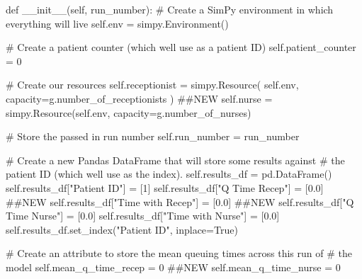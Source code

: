 \documentclass[
  letterpaper,
  DIV=11,
  numbers=noendperiod]{scrreprt}
\newenvironment{Shaded}{}{}
\newcommand{\CommentTok}[1]{\textcolor[rgb]{0.42,0.45,0.49}{#1}}
\newcommand{\DecValTok}[1]{\textcolor[rgb]{0.00,0.36,0.77}{#1}}
\newcommand{\FloatTok}[1]{\textcolor[rgb]{0.00,0.36,0.77}{#1}}
\newcommand{\FunctionTok}[1]{\textcolor[rgb]{0.44,0.26,0.76}{#1}}
\newcommand{\KeywordTok}[1]{\textcolor[rgb]{0.84,0.23,0.29}{#1}}
\newcommand{\NormalTok}[1]{\textcolor[rgb]{0.14,0.16,0.18}{#1}}
\newcommand{\OperatorTok}[1]{\textcolor[rgb]{0.14,0.16,0.18}{#1}}
\newcommand{\StringTok}[1]{\textcolor[rgb]{0.01,0.18,0.38}{#1}}
\newcommand{\VariableTok}[1]{\textcolor[rgb]{0.89,0.38,0.04}{#1}}
\begin{document}
\begin{Shaded}
\begin{Highlighting}[]
\KeywordTok{def} \FunctionTok{\_\_init\_\_}\NormalTok{(}\VariableTok{self}\NormalTok{, run\_number):}
        \CommentTok{\# Create a SimPy environment in which everything will live}
        \VariableTok{self}\NormalTok{.env }\OperatorTok{=}\NormalTok{ simpy.Environment()}

        \CommentTok{\# Create a patient counter (which we\textquotesingle{}ll use as a patient ID)}
        \VariableTok{self}\NormalTok{.patient\_counter }\OperatorTok{=} \DecValTok{0}

        \CommentTok{\# Create our resources}
        \VariableTok{self}\NormalTok{.receptionist }\OperatorTok{=}\NormalTok{ simpy.Resource(}
            \VariableTok{self}\NormalTok{.env, capacity}\OperatorTok{=}\NormalTok{g.number\_of\_receptionists}
\NormalTok{        ) }\CommentTok{\#\#NEW}
        \VariableTok{self}\NormalTok{.nurse }\OperatorTok{=}\NormalTok{ simpy.Resource(}\VariableTok{self}\NormalTok{.env, capacity}\OperatorTok{=}\NormalTok{g.number\_of\_nurses)}

        \CommentTok{\# Store the passed in run number}
        \VariableTok{self}\NormalTok{.run\_number }\OperatorTok{=}\NormalTok{ run\_number}

        \CommentTok{\# Create a new Pandas DataFrame that will store some results against}
        \CommentTok{\# the patient ID (which we\textquotesingle{}ll use as the index).}
        \VariableTok{self}\NormalTok{.results\_df }\OperatorTok{=}\NormalTok{ pd.DataFrame()}
        \VariableTok{self}\NormalTok{.results\_df[}\StringTok{"Patient ID"}\NormalTok{] }\OperatorTok{=}\NormalTok{ [}\DecValTok{1}\NormalTok{]}
        \VariableTok{self}\NormalTok{.results\_df[}\StringTok{"Q Time Recep"}\NormalTok{] }\OperatorTok{=}\NormalTok{ [}\FloatTok{0.0}\NormalTok{] }\CommentTok{\#\#NEW}
        \VariableTok{self}\NormalTok{.results\_df[}\StringTok{"Time with Recep"}\NormalTok{] }\OperatorTok{=}\NormalTok{ [}\FloatTok{0.0}\NormalTok{] }\CommentTok{\#\#NEW}
        \VariableTok{self}\NormalTok{.results\_df[}\StringTok{"Q Time Nurse"}\NormalTok{] }\OperatorTok{=}\NormalTok{ [}\FloatTok{0.0}\NormalTok{]}
        \VariableTok{self}\NormalTok{.results\_df[}\StringTok{"Time with Nurse"}\NormalTok{] }\OperatorTok{=}\NormalTok{ [}\FloatTok{0.0}\NormalTok{]}
        \VariableTok{self}\NormalTok{.results\_df.set\_index(}\StringTok{"Patient ID"}\NormalTok{, inplace}\OperatorTok{=}\VariableTok{True}\NormalTok{)}

        \CommentTok{\# Create an attribute to store the mean queuing times across this run of}
        \CommentTok{\# the model}
        \VariableTok{self}\NormalTok{.mean\_q\_time\_recep }\OperatorTok{=} \DecValTok{0} \CommentTok{\#\#NEW}
        \VariableTok{self}\NormalTok{.mean\_q\_time\_nurse }\OperatorTok{=} \DecValTok{0}
\end{Highlighting}
\end{Shaded}
\end{document}
